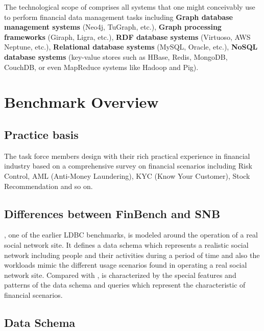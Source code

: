 The technological scope of \ldbcfinbench comprises all systems that one might
conceivably use to perform financial data management tasks including
\textbf{Graph database management systems} (\eg Neo4j, TuGraph, etc.), \textbf{
Graph processing frameworks} (\eg Giraph, Ligra, etc.), \textbf{RDF database
systems} (\eg Virtuoso, AWS Neptune, etc.), \textbf{Relational database systems}
(\eg MySQL, Oracle, etc.), \textbf{NoSQL database systems} (\eg key-value stores
such as HBase, Redis, MongoDB, CouchDB, or even MapReduce systems like Hadoop
and Pig).


\section{Benchmark Overview}

\subsection{Practice basis}

The task force members design \ldbcfinbench with their rich practical experience in
financial industry based on a comprehensive survey on financial scenarios including
Risk Control, AML (Anti-Money Laundering), KYC (Know Your Customer), Stock Recommendation
and so on.

\subsection{Differences between FinBench and SNB}

\ldbcsnb, one of the earlier LDBC benchmarks, is modeled around the operation of a real social network site. It defines a data schema which represents a realistic social network including people and their activities during a period of time and also the workloads mimic the different usage scenarios found in operating a real social network site. Compared with \ldbcsnb, \ldbcfinbench is characterized by the special features and patterns of the data schema and queries which represent the characteristic of financial scenarios.

\subsection{Data Schema}

